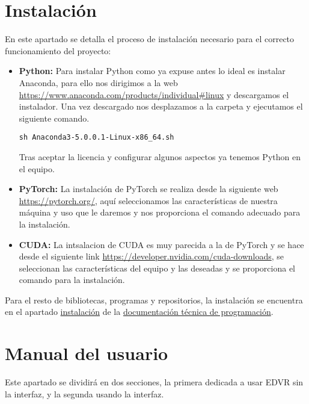 \section{Instalación}
En este apartado se detalla el proceso de instalación necesario para el correcto funcionamiento del proyecto:
\begin{itemize}
\item \textbf{Python:} Para instalar Python como ya expuse antes lo ideal es instalar Anaconda, para ello nos dirigimos a la web \url{https://www.anaconda.com/products/individual#linux} y descargamos el instalador.
Una vez descargado nos desplazamos a la carpeta y ejecutamos el siguiente comando.
\begin{verbatim}
sh Anaconda3-5.0.0.1-Linux-x86_64.sh
\end{verbatim}

Tras aceptar la licencia y configurar algunos aspectos ya tenemos Python en el equipo.

\item \textbf{PyTorch:} La instalación de PyTorch se realiza desde la siguiente web \url{https://pytorch.org/}, aquí seleccionamos las características de nuestra máquina y uso que le daremos y nos proporciona el comando adecuado para la instalación.
  

\item \textbf{CUDA:} La intsalacion de CUDA es muy parecida a la de PyTorch y se hace desde el siguiente link \url{https://developer.nvidia.com/cuda-downloads}, se seleccionan las características del equipo y las deseadas y se proporciona el comando para la instalación.


\end{itemize}

Para el resto de bibliotecas, programas y repositorios, la instalación se encuentra en el apartado \hyperref[sub:ins]{instalación} de la \hyperref[ape:dtp]{documentación técnica de programación}.

\section{Manual del usuario}

Este apartado se dividirá en dos secciones, la primera dedicada a usar EDVR sin la interfaz, y la segunda usando la interfaz.


